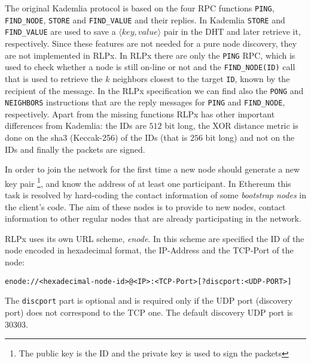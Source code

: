 The original Kademlia protocol is based on the four RPC functions 
\verb|PING|, \verb|FIND_NODE|,
\verb|STORE| and \verb|FIND_VALUE| and their replies.
In Kademlia \verb|STORE| and \verb|FIND_VALUE| are used to save a 
$\langle key, value\rangle$ pair in the DHT and later retrieve it, respectively.
Since these features are not needed for a pure node discovery, they
are not implemented in RLPx.
In RLPx there are only the \verb|PING| RPC, which is used to check whether a
node is still on-line or not and the \verb|FIND_NODE(ID)| call that is used to
retrieve the $k$ neighbors closest to the target \verb|ID|, known by the
recipient of the message. In the RLPx specification we can find also 
the \verb|PONG| and \verb|NEIGHBORS| instructions that are the reply messages
for \verb|PING| and \verb|FIND_NODE|, respectively.
Apart from the missing functions RLPx has other important differences
from Kademlia:
the IDs are $512$ bit long, the XOR distance metric is done on the sha3 
(Keccak-256) of the IDs (that is $256$ bit long) and not on the IDs and 
finally the packets are signed.

In order to join the network for the first time a new node should 
generate a new key pair
\footnote{The public key is the ID and the private key is used to sign the packets}, and
know the address of at least one participant.
In Ethereum this task is resolved by hard-coding the contact information
of some \textit{bootstrap nodes} in the client's code.
The aim of these nodes is to provide to new nodes, contact information to
other regular nodes that are already participating in the network.

RLPx uses its own URL scheme, \emph{enode}.
In this scheme are specified the ID of the node encoded in hexadecimal format,
the IP-Address and the TCP-Port of the node: 
\begin{verbatim}
enode://<hexadecimal-node-id>@<IP>:<TCP-Port>[?discport:<UDP-PORT>]
\end{verbatim} 
The \verb|discport| part is optional and is required only if the
UDP port (discovery port) does not correspond to the TCP one.
The default discovery UDP port is 30303.

